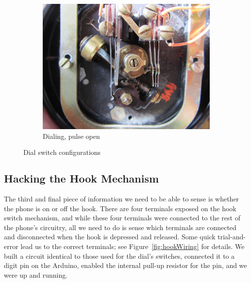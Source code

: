 \documentclass{es50report}
\begin{document}
\begin{figure}
        \begin{subfigure}[b]{0.32\textwidth}
                \includegraphics[width=\textwidth, clip=true, trim=300 250 300 70]{images/dialPulse}
                \caption{Dialing, pulse open}
                \label{fig:dialPulse}
        \end{subfigure}
        \caption{Dial switch configurations}\label{fig:dialState}
    \end{figure}

    \subsection{Hacking the Hook Mechanism}
    The third and final piece of information we need to be able to sense is whether the phone is on or off the hook. There are four terminals exposed on the hook switch mechanism, and while these four terminals were connected to the rest of the phone's circuitry, all we need to do is sense which terminals are connected and disconnected when the hook is depressed and released. Some quick trial-and-error lead us to the correct terminals; see Figure~\ref{fig:hookWiring} for details. We built a circuit identical to those used for the dial's switches, connected it to a digit pin on the Arduino, enabled the internal pull-up resistor for the pin, and we were up and running.
\end{document}
